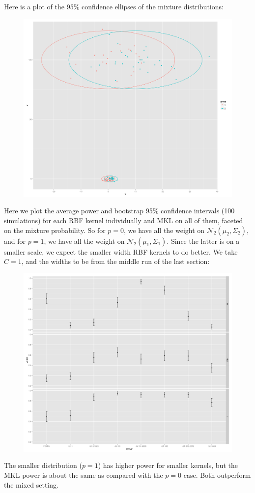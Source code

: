Here is a plot of the 95\% confidence ellipses of the mixture distributions:
\begin{figure}[!ht]
  \centering
  \includegraphics[scale=.3]{vectorial_distributions.png}
\end{figure}

Here we plot the average power and bootstrap 95\% confidence intervals
(100 simulations) for each RBF kernel individually and MKL on all of
them, faceted on the mixture probability.  So for $p = 0$, we have all
the weight on $\mathcal{N}_2(\mu_2, \Sigma_2)$, and for $p = 1$, we
have all the weight on $\mathcal{N}_2(\mu_1, \Sigma_1)$.  Since the
latter is on a smaller scale, we expect the smaller width RBF kernels
to do better.  We take $C = 1$, and the widths to be from the middle
run of the last section:
\begin{figure}[!ht]
  \centering
  \includegraphics[scale=.3]{vectorial_power.png}
\end{figure}
The smaller distribution ($p=1$) has higher power for smaller kernels,
but the MKL power is about the same as compared with the $p=0$ case.
Both outperform the mixed setting.

